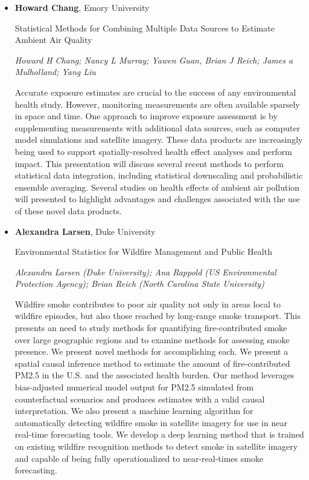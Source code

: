 \begin{itemize}
\item \textbf{Howard Chang}, Emory University

Statistical Methods for Combining Multiple Data Sources to Estimate Ambient Air Quality

\emph{\footnotesize Howard H Chang; Nancy L Murray; Yawen Guan, Brian J Reich; James a Mulholland;  Yang Liu}

Accurate exposure estimates are crucial to the success of any environmental health study. However, monitoring measurements are often available sparsely in space and time. One approach to improve exposure assessment is by supplementing measurements with additional data sources, such as computer model simulations and satellite imagery. These data products are increasingly being used to support spatially-resolved health effect analyses and perform impact.  This presentation will discuss several recent methods to perform statistical data integration, including statistical downscaling and probabilistic ensemble averaging. Several studies on health effects of ambient air pollution will presented to highlight advantages and challenges associated with the use of these novel data products.

\item \textbf{Alexandra Larsen}, Duke University

Environmental Statistics for Wildfire Management and Public Health

\emph{\footnotesize Alexandra Larsen (Duke University); Ana Rappold (US Environmental Protection Agency); Brian Reich (North Carolina State University)}

Wildfire smoke contributes to poor air quality not only in areas local to wildfire episodes, but also those reached by long-range smoke transport. This presents an need to study methods for quantifying fire-contributed smoke over large geographic regions and to examine methods for assessing smoke presence. We present novel methods for accomplishing each. We present a spatial causal inference method to estimate the amount of fire-contributed PM2.5 in the U.S. and the associated health burden. Our method leverages bias-adjusted numerical model output for PM2.5 simulated from counterfactual scenarios and produces estimates with a valid causal interpretation. We also present a machine learning algorithm for automatically detecting wildfire smoke in satellite imagery for use in near real-time forecasting tools. We develop a deep learning method that is trained on existing wildfire recognition methods to detect smoke in satellite imagery and capable of being fully operationalized to near-real-times smoke forecasting.


\end{itemize}
